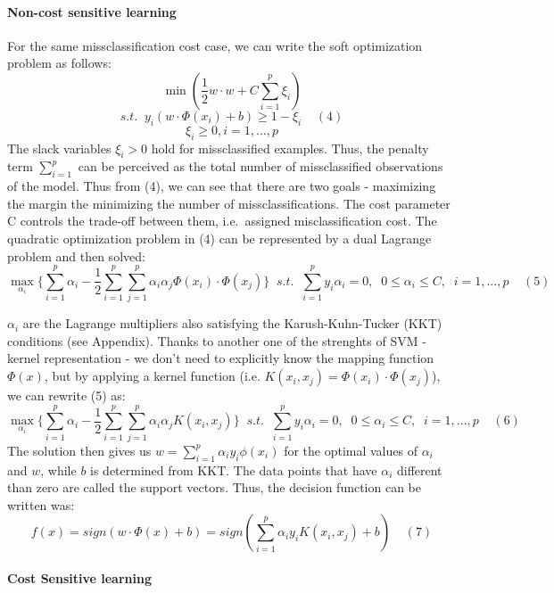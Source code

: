 \documentclass[12pt,]{article}
\let\oldparagraph\paragraph
\renewcommand{\paragraph}[1]{\oldparagraph{#1}\mbox{}}
\begin{document}
\hypertarget{non-cost-sensitive-learning}{%
\paragraph{Non-cost sensitive
learning}\label{non-cost-sensitive-learning}}

For the same missclassification cost case, we can write the soft
optimization problem as follows:
\[\min(\frac{1}{2}w \cdot w + C\sum_{i=1}^{p} \xi_i) \]
\[s.t. \;\; y_i(w \cdot \Phi(x_i) + b) \geq 1 - \xi_i\;\;\;\;(4) \]
\[\xi_i \geq 0, i = 1,...,p\] The slack variables \(\xi_i > 0\) hold for
missclassified examples. Thus, the penalty term \(\sum_{i=1}^{p}\) can
be perceived as the total number of missclassified observations of the
model. Thus from (4), we can see that there are two goals - maximizing
the margin the minimizing the number of missclassifications. The cost
parameter C controls the trade-off between them, i.e.~assigned
misclassification cost. The quadratic optimization problem in (4) can be
represented by a dual Lagrange problem and then solved:
\[\max_{\alpha_i} \{ \sum_{i=1}^{p}{\alpha_i} - \frac{1}{2} \sum_{i=1}^{p}\sum_{j=1}^{p}{\alpha_i\alpha_j\Phi(x_i)\cdot\Phi(x_j)} \} \;\; s.t. \;\; \sum_{i=1}^{p}{y_i\alpha_i}=0, \;\; 0 \leq\alpha_i\leq C, \;\; i=1,...,p\;\;\;\;(5) \]

\(\alpha_i\) are the Lagrange multipliers also satisfying the
Karush-Kuhn-Tucker (KKT) conditions (see Appendix). Thanks to another
one of the strenghts of SVM - kernel representation - we don't need to
explicitly know the mapping function \(\Phi(x)\), but by applying a
kernel function (i.e. \(K(x_i,x_j) = \Phi(x_i)\cdot \Phi(x_j)\)), we can
rewrite (5) as:
\[\max_{\alpha_i} \{ \sum_{i=1}^{p}{\alpha_i} - \frac{1}{2} \sum_{i=1}^{p}\sum_{j=1}^{p}{\alpha_i\alpha_jK(x_i,x_j)} \} \;\; s.t. \;\; \sum_{i=1}^{p}{y_i\alpha_i}=0, \;\; 0 \leq\alpha_i\leq C, \;\; i=1,...,p\;\;\;\;(6)\]
The solution then gives us \(w = \sum_{i=1}^{p}{\alpha_iy_i}\phi(x_i)\)
for the optimal values of \(\alpha_i\) and \(w\), while \(b\) is
determined from KKT. The data points that have \(\alpha_i\) different
than zero are called the support vectors. Thus, the decision function
can be written was:
\[f(x) = sign(w \cdot \Phi(x) + b) = sign(\sum_{i=1}^{p}{\alpha_iy_i}K(x_i,x_j) + b)\;\;\;\;(7) \]

\hypertarget{cost-sensitive-learning}{%
\paragraph{Cost Sensitive learning}\label{cost-sensitive-learning}}
\end{document}
